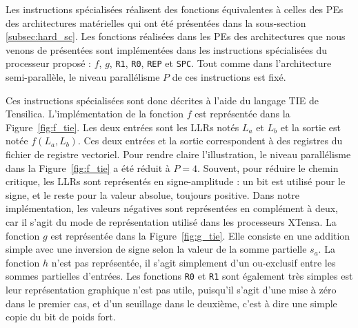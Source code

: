 Les instructions spécialisées réalisent des fonctions équivalentes à celles des PEs des architectures matérielles qui ont été présentées dans la sous-section \ref{subsec:hard_sc}.
Les fonctions réalisées dans les PEs des architectures que nous venons de présentées sont implémentées dans les instructions spécialisées du processeur proposé : $f$, $g$, \texttt{R1}, \texttt{R0}, \texttt{REP} et \texttt{SPC}. Tout comme dans l'architecture semi-parallèle, le niveau parallélisme $P$ de ces instructions est fixé.

Ces instructions spécialisées sont donc décrites à l'aide du langage TIE de Tensilica.
L'implémentation de la fonction $f$ est représentée dans la Figure~\ref{fig:f_tie}. Les deux entrées sont les LLRs notés $L_a$ et $L_b$ et la sortie est notée $f(L_a,L_b)$. Ces deux entrées et la sortie correspondent à des registres du fichier de registre vectoriel. Pour rendre claire l'illustration, le niveau parallélisme dans la Figure~\ref{fig:f_tie} a été réduit à $P=4$. Souvent, pour réduire le chemin critique, les LLRs sont représentés en \og signe-amplitude \fg : un bit est utilisé pour le signe, et le reste pour la valeur absolue, toujours positive. Dans notre implémentation, les valeurs négatives sont représentées en complément à deux, car il s'agit du mode de représentation utilisé dans les processeurs XTensa.
La fonction $g$ est représentée dans la Figure~\ref{fig:g_tie}. Elle consiste en une addition simple avec une inversion de signe selon la valeur de la somme partielle $s_a$.
La fonction $h$ n'est pas représentée, il s'agit simplement d'un ou-exclusif entre les sommes partielles d'entrées. Les fonctions \texttt{R0} et \texttt{R1} sont également très simples est leur représentation graphique n'est pas utile, puisqu'il s'agit d'une mise à zéro dans le premier cas, et d'un seuillage dans le deuxième, c'est à dire une simple copie du bit de poids fort.
